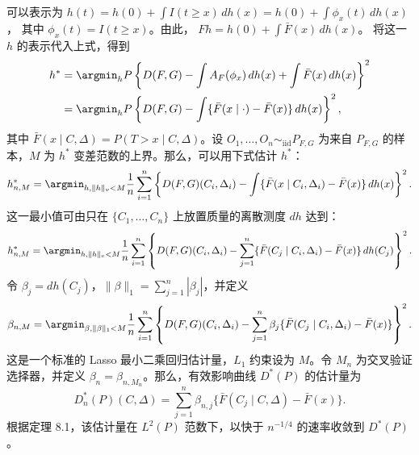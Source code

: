 可以表示为
$h(t)=h(0)+\int I(t\geq x)\,dh(x)=h(0)+\int\phi_x(t)\,dh(x)$，
其中 $\phi_x(t)=I(t\geq x)$。由此，
$Fh=h(0)+\int\bar F(x)\,dh(x)$。
将这一 $h$ 的表示代入上式，得到
\[
 \begin{aligned}
 h^*&=\argmin_h P\left\{D(F,G)-\int A_F(\phi_x)\,dh(x)
 +\int\bar F(x)\,dh(x)\right\}^2\\
 &=\argmin_h P\left\{D(F,G)-\int
 \{\bar F(x\mid\cdot)-\bar F(x)\}\,dh(x)\right\}^2,
 \end{aligned}
\]
其中 $\bar F(x\mid C,\Delta)=P(T>x\mid C,\Delta)$。设
$O_1,\ldots,O_n\sim_{\mathrm{iid}}P_{F,G}$
为来自 $P_{F,G}$ 的样本，$M$ 为 $h^*$ 变差范数的上界。那么，可以用下式估计 $h^*$：
\[
 h_{n,M}^*=\argmin_{h,\|h\|_v<M}\frac1n\sum_{i=1}^n
 \left\{D(F,G)(C_i,\Delta_i)-\int
 \{\bar F(x\mid C_i,\Delta_i)-\bar F(x)\}\,dh(x)\right\}^2.
\]
这一最小值可由只在 $\{C_1,\ldots,C_n\}$ 上放置质量的离散测度 $dh$ 达到：
\[
 h_{n,M}^*=\argmin_{h,\|h\|_v<M}\frac1n\sum_{i=1}^n
 \left\{D(F,G)(C_i,\Delta_i)-\sum_{j=1}^n
 \{\bar F(C_j\mid C_i,\Delta_i)-\bar F(x)\}\,dh(C_j)\right\}^2.
\]
令 $\beta_j=dh(C_j)$，$\|\beta\|_1=\sum_{j=1}^n|\beta_j|$，并定义
\[
 \beta_{n,M}=\argmin_{\beta,\|\beta\|_1<M}\frac1n\sum_{i=1}^n
 \left\{D(F,G)(C_i,\Delta_i)-\sum_{j=1}^n
 \beta_j\{\bar F(C_j\mid C_i,\Delta_i)-\bar F(x)\}\right\}^2.
\]
这是一个标准的 Lasso 最小二乘回归估计量，$L_1$ 约束设为 $M$。令 $M_n$ 为交叉验证选择器，并定义 $\beta_n=\beta_{n,M_n}$。那么，有效影响曲线 $D^*(P)$ 的估计量为
\[
 D_n^*(P)(C,\Delta)=\sum_{j=1}^n
 \beta_{n,j}\{\bar F(C_j\mid C,\Delta)-\bar F(x)\}.
\]
根据定理 8.1，该估计量在 $L^2(P)$ 范数下，以快于 $n^{-1/4}$ 的速率收敛到 $D^*(P)$。
